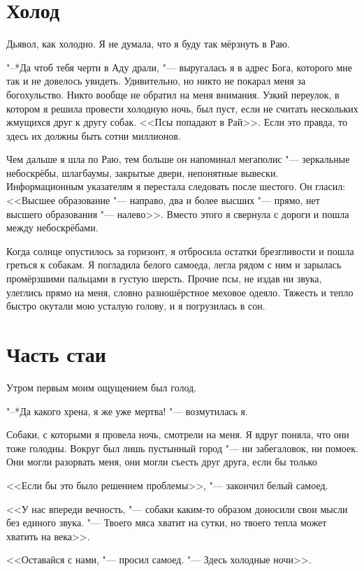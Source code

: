 \section{Холод}

Дьявол, как холодно.
Я не думала, что я буду так мёрзнуть в Раю.

"--*Да чтоб тебя черти в Аду драли, "--- выругалась я в адрес Бога, которого мне так и не довелось увидеть.
Удивительно, но никто не покарал меня за богохульство.
Никто вообще не обратил на меня внимания.
Узкий переулок, в котором я решила провести холодную ночь, был пуст, если не считать нескольких жмущихся друг к другу собак.
<<Псы попадают в Рай>>.
Если это правда, то здесь их должны быть сотни миллионов.

Чем дальше я шла по Раю, тем больше он напоминал мегаполис "--- зеркальные небоскрёбы, шлагбаумы, закрытые двери, непонятные вывески.
Информационным указателям я перестала следовать после шестого.
Он гласил: <<Высшее образование "--- направо, два и более высших "--- прямо, нет высшего образования "--- налево>>.
Вместо этого я свернула с дороги и пошла между небоскрёбами.

Когда солнце опустилось за горизонт, я отбросила остатки брезгливости и пошла греться к собакам.
Я погладила белого самоеда, легла рядом с ним и зарылась промёрзшими пальцами в густую шерсть.
Прочие псы, не издав ни звука, улеглись прямо на меня, словно разношёрстное меховое одеяло.
Тяжесть и тепло быстро окутали мою усталую голову, и я погрузилась в сон.

\section{Часть стаи}

Утром первым моим ощущением был голод.

"--*Да какого хрена, я же уже мертва! "--- возмутилась я.

Собаки, с которыми я провела ночь, смотрели на меня.
Я вдруг поняла, что они тоже голодны.
Вокруг был лишь пустынный город "--- ни забегаловок, ни помоек.
Они могли разорвать меня, они могли съесть друг друга, если бы только\ldotst

<<Если бы это было решением проблемы>>, "--- закончил белый самоед.

<<У нас впереди вечность, "--- собаки каким-то образом доносили свои мысли без единого звука.
"--- Твоего мяса хватит на сутки, но твоего тепла может хватить на века>>.

<<Оставайся с нами, "--- просил самоед.
"--- Здесь холодные ночи>>.

